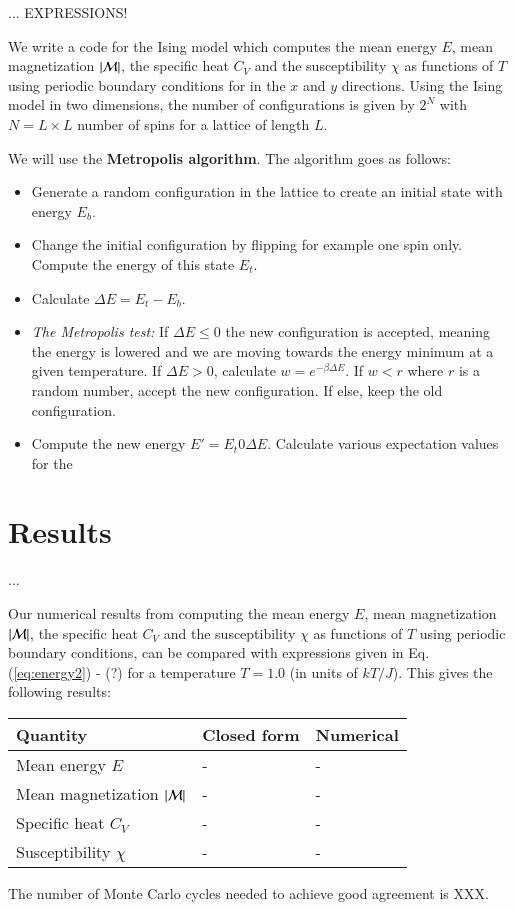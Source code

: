 \documentclass{article}
\begin{document}
\begin{multicols}{2}
... EXPRESSIONS! 


We write a code for the Ising model which computes the mean energy $E$, mean magnetization $|{\cal M}|$, the specific heat $C_V$ and the susceptibility $\chi$ as functions of  $T$ using periodic boundary conditions for in the $x$ and $y$ directions. Using the Ising model in two dimensions, the number of configurations is given by $2^N$ with $N = L \times L$ number of spins for a lattice of length $L$. 

We will use the \textbf{Metropolis algorithm}. The algorithm goes as follows:

\begin{itemize}
	\item Generate a random configuration in the lattice to create an initial state with energy $E_b$.
	\item Change the initial configuration by flipping for example one spin only. Compute the energy of this state $E_t$.
	\item Calculate $\Delta E = E_t - E_b$.
	\item \textit{The Metropolis test:} If $\Delta E \leq 0$ the new configuration is accepted, meaning the energy is lowered and we are moving towards the energy minimum at a given temperature. If $\Delta E > 0$, calculate $w = e^{- \beta \Delta E}$. If $w < r$ where $r$ is a random number, accept the new configuration. If else, keep the old configuration.
	\item Compute the new energy $E' = E_t 0 \Delta E$. Calculate various expectation values for the 
\end{itemize}





\section{Results}

...

Our numerical results from computing the mean energy $E$, mean magnetization $|{\cal M}|$, the specific heat $C_V$ and the susceptibility $\chi$ as functions of $T$ using periodic boundary conditions, can be compared with expressions given in Eq. (\ref{eq:energy2}) - (?) for a temperature $T=1.0$ (in units of $kT/J$). This gives the following results:

\begin{center}
\begin{tabular}{ l l l }\hline
	Quantity 								& Closed form	 				& Numerical		\\ \hline
	Mean energy $E$ 						& - 							& -		 \\
	Mean magnetization $|{\cal M}|$ 			& -							& -		 \\
	Specific heat $C_V$						& -							& - 		\\
	Susceptibility $\chi$						& -							& -		\\
	\hline
\end{tabular}
\end{center}
The number of Monte Carlo cycles needed to achieve good agreement is XXX.



\end{multicols}
\end{document}
